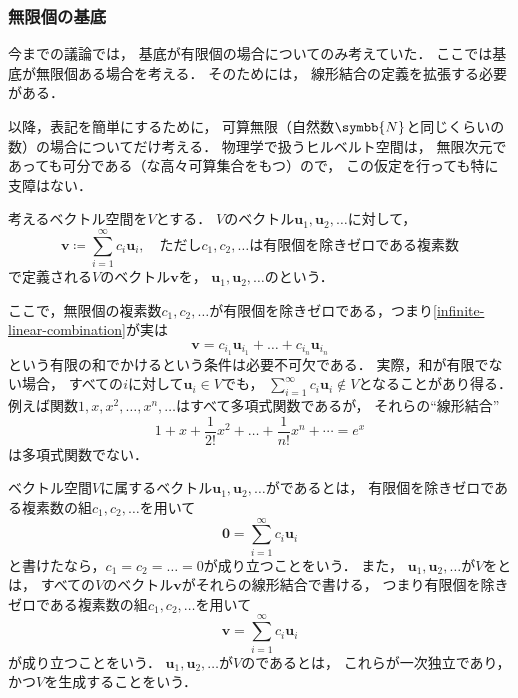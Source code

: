 \documentclass[
]{sotsu}
\newcommand{\fire}[1]{\textcolor{fire}{#1}}
\begin{document}
\subsubsection{無限個の基底}
\label{sec:infinite-basis}

今までの議論では，
基底が有限個の場合についてのみ考えていた．
ここでは基底が無限個ある場合を考える．
そのためには，
線形結合の定義を拡張する必要がある．

以降，表記を簡単にするために，
可算無限（自然数$\symbb{N}$と同じくらいの数）の場合についてだけ考える．
物理学で扱うヒルベルト空間は，
無限次元であっても可分である（な高々可算集合をもつ）ので，
この仮定を行っても特に支障はない．

考えるベクトル空間を$V$とする．
$V$のベクトル$\symbf{u}_1, \symbf{u}_2, \dots$に対して，
\begin{equation}
    \label{eq:infinite-linear-combination}
    \symbf{v} \coloneq
    \sum_{i = 1}^{\infty} c_i \symbf{u}_i,
    \quad
    \text{ただし$c_1, c_2, \dots$は有限個を除きゼロである複素数}
\end{equation}
で定義される$V$のベクトル$\symbf{v}$を，
$\symbf{u}_1, \symbf{u}_2, \dots$のという．

ここで，無限個の複素数$c_1, c_2, \dots$が有限個を除きゼロである，つまり\cref{infinite-linear-combination}が実は
\begin{equation*}
    \symbf{v} = c_{i_1} \symbf{u}_{i_1} + \dots + c_{i_n} \symbf{u}_{i_n}
\end{equation*}
という有限の和でかけるという条件は必要不可欠である．
実際，和が有限でない場合，
すべての$i$に対して$\symbf{u}_i \in V$でも，
$\sum_{i=1}^{\infty} c_i \symbf{u}_i \notin V$となることがあり得る．
例えば関数$1, x, x^2, \dots, x^n, \dots$はすべて多項式関数であるが，
それらの``線形結合''
\begin{equation}
    \label{eq:exponential-expansion}
    1 + x + \frac{1}{2!} x^2 + \dots + \frac{1}{n!} x^n + \dotsb = e^x
\end{equation}
は多項式関数でない．

ベクトル空間$V$に属するベクトル$\symbf{u}_1, \symbf{u}_2, \dots$がであるとは，
\fire{有限個を除きゼロである}複素数の組$c_1, c_2, \dots$を用いて
\begin{equation*}
    \symbf{0} = \sum_{i = 1}^{\infty} c_i \symbf{u}_i
\end{equation*}
と書けたなら，$c_1 = c_2 = \dots = 0$が成り立つことをいう．
また，
$\symbf{u}_1, \symbf{u}_2, \dots$が$V$をとは，
すべての$V$のベクトル$\symbf{v}$がそれらの線形結合で書ける，
つまり\fire{有限個を除きゼロである}複素数の組$c_1, c_2, \dots$を用いて
\begin{equation*}
    \symbf{v} = \sum_{i = 1}^{\infty} c_i \symbf{u}_i
\end{equation*}
が成り立つことをいう．
$\symbf{u}_1, \symbf{u}_2, \dots$が$V$のであるとは，
これらが一次独立であり，
かつ$V$を生成することをいう．
\end{document}
